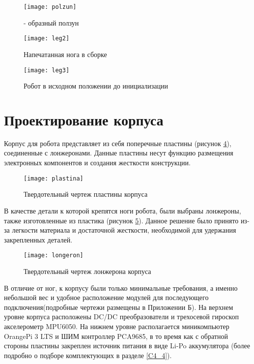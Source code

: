 \begin{figure}[h!]
	\begin{center}
		\texttt{[image: polzun]}
		\caption{ - образный ползун}
		\label{polzun}
	\end{center}
\end{figure}

\begin{figure}[h!]
	\begin{center}
		\texttt{[image: leg2]}
		\caption{Напечатанная нога в сборке}
		\label{leg2}
	\end{center}
\end{figure}

\begin{figure}[h!]
	\begin{center}
		\texttt{[image: leg3]}
		\caption{Робот в исходном положении до инициализации}
		\label{leg3}
	\end{center}
\end{figure}

\newpage
\section{Проектирование корпуса}\label{C4_3}

Корпус для робота представляет из себя поперечные пластины (рисунок \ref{plastina}), соединенные с лонжеронами. Данные пластины несут функцию размещения электронных компонентов и создания жесткости конструкции. 

\begin{figure}[h!]
	\begin{center}
		\texttt{[image: plastina]}
		\caption{Твердотельный чертеж пластины корпуса}
		\label{plastina}
	\end{center}
\end{figure}

В качестве детали к которой крепятся ноги робота, были выбраны лонжероны, также изготовленные из пластика (рисунок \ref{longeron}). Данное решение было принято из-за легкости материала и достаточной жесткости, необходимой для удержания закрепленных деталей. 

\begin{figure}[h!]
	\begin{center}
		\texttt{[image: longeron]}
		\caption{Твердотельный чертеж лонжерона корпуса}
		\label{longeron}
	\end{center}
\end{figure}
\pagebreak
В отличие от ног, к корпусу были только минимальные требования, а именно небольшой вес и удобное расположение модулей для последующего подключения(подробные чертежи размещены в Приложении Б). На верхнем уровне корпуса расположены DC/DC преобразователи и трехосевой гироскоп акселерометр MPU6050. На нижнем уровне располагается миникомпьютер OrangePi 3 LTS и ШИМ контроллер PCA9685, в то время как с обратной стороны пластины закреплен источник питания в виде Li-Po аккумулятора (более подробно о подборе комплектующих в разделе \ref{C4_4}).


